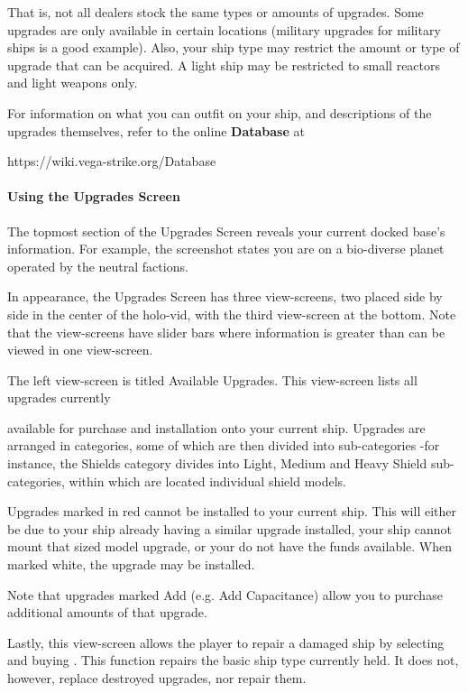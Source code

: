 \documentclass{article}
\newcommand{\key}[1]{%
  \tikz[baseline=(key.base)]{
    \node[draw=gray!50, fill=gray!5, rounded corners=2pt, inner sep=2pt, minimum height=1.5ex] (key) {\footnotesize\sffamily\bfseries #1};
  }%
}
\begin{document}
That is, not all dealers stock the same types or amounts of upgrades. Some upgrades are only available in certain locations (military upgrades for military ships is a good example). Also, your ship type may restrict the amount or type of upgrade that can be acquired. A light ship may be restricted to small reactors and light weapons only. 

For information on what you can outfit on your ship, and descriptions of the upgrades themselves, refer to the online \textbf{Database} at 

https://wiki.vega-strike.org/Database

 
\paragraph{Using the Upgrades Screen}

The topmost section of the Upgrades Screen reveals your current docked base's information. For example, the screenshot states you are on a bio-diverse planet operated by the neutral factions. 

In appearance, the Upgrades Screen has three view-screens, two placed side by side in the center of the holo-vid, with the third view-screen at the bottom. Note that the view-screens have slider bars where information is greater than can be viewed in one view-screen. 

The left view-screen is titled Available Upgrades. This view-screen lists all upgrades currently 

available for purchase and installation onto your current ship. Upgrades are arranged in categories, some of which are then divided into sub-categories -for instance, the Shields category divides into Light, Medium and Heavy Shield sub-categories, within which are located individual shield models. 

Upgrades marked in red cannot be installed to your current ship. This will either be due to your ship already having a similar upgrade installed, your ship cannot mount that sized model upgrade, or your do not have the funds available. When marked white, the upgrade may be installed. 

Note that upgrades marked Add (e.g. Add Capacitance) allow you to purchase additional amounts of that upgrade. 

Lastly, this view-screen allows the player to repair a damaged ship by selecting and buying \key{Basic Repair}. This function repairs the basic ship type currently held. It does not, however, replace destroyed upgrades, nor repair them. 
\end{document}
